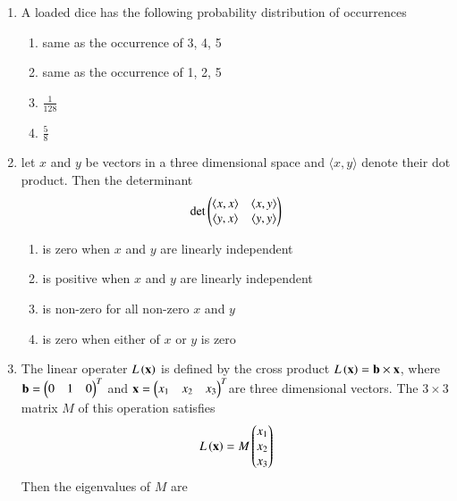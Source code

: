 \documentclass[journal]{IEEEtran}
\numberwithin{equation}{enumi}
\numberwithin{figure}{enumi}
\begin{document}
\begin{enumerate}
    \item 
    A loaded dice has the following probability distribution of occurrences

    \begin{table}[h!]    
      \centering
      
    \end{table}
    \begin{enumerate}
        \item same as the occurrence of 3, 4, 5
        \item same as the occurrence of 1, 2, 5
        \item $\frac{1}{128}$
        \item $\frac{5}{8}$
    \end{enumerate}

    \item 
    let $x$ and $y$ be vectors in a three dimensional space and $\langle x,y\rangle$ denote their dot product. Then the determinant 
    \begin{align*}
        \text{det}\begin{pmatrix}\langle x,x\rangle & \langle x,y\rangle \\ \langle y,x\rangle & \langle y,y\rangle\end{pmatrix} 
    \end{align*}
    \begin{enumerate}
        \item is zero when $x$ and $y$ are linearly independent
        \item is positive when $x$ and $y$ are linearly independent
        \item is non-zero for all  non-zero $x$ and $y$
        \item is zero when either of $x$ or $y$ is zero
    \end{enumerate}

    \item 
    The linear operater $L\left(\mathbf{x}\right)$ is defined by the cross product $L\left(\mathbf{x}\right) = \mathbf{b} \times \mathbf{x}$, where $\mathbf{b} = \begin{pmatrix}0 & 1 & 0\end{pmatrix}^{T}$ and $\mathbf{x} = \begin{pmatrix}x_1 & x_2 & x_3\end{pmatrix}^{T}$are three dimensional vectors. The $3 \times 3$ matrix $M$ of this operation satisfies 
    \begin{align*}
        L\left(\mathbf{x}\right) = M\begin{pmatrix}x_1 \\ x_2 \\ x_3\end{pmatrix}
    \end{align*}
    Then the eigenvalues of $M$ are
    \begin{enumerate}
    \end{enumerate}


\end{enumerate}
\end{document}

